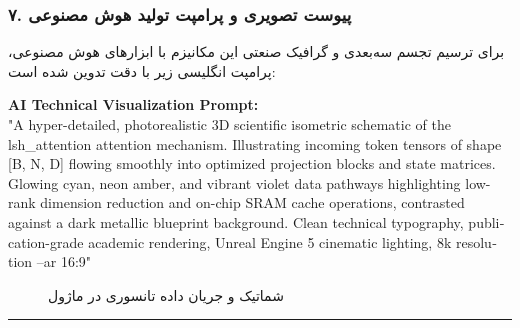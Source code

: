 \subsubsection*{۷. پیوست تصویری و پرامپت تولید هوش مصنوعی}
برای ترسیم تجسم سه‌بعدی و گرافیک صنعتی این مکانیزم با ابزارهای هوش مصنوعی، پرامپت انگلیسی زیر با دقت تدوین شده است:

\vspace{0.2cm}
\begin{latin}
\footnotesize
\textbf{AI Technical Visualization Prompt:}\\
"A hyper-detailed, photorealistic 3D scientific isometric schematic of the lsh\_attention attention mechanism. Illustrating incoming token tensors of shape [B, N, D] flowing smoothly into optimized projection blocks and state matrices. Glowing cyan, neon amber, and vibrant violet data pathways highlighting low-rank dimension reduction and on-chip SRAM cache operations, contrasted against a dark metallic blueprint background. Clean technical typography, publication-grade academic rendering, Unreal Engine 5 cinematic lighting, 8k resolution --ar 16:9"
\end{latin}

\begin{figure}[H]
    \centering
    \caption{شماتیک و جریان داده تانسوری در ماژول }
    \label{fig:lsh_attention}
\end{figure}

\vspace{0.5cm}
\hrule
\vspace{0.5cm}
